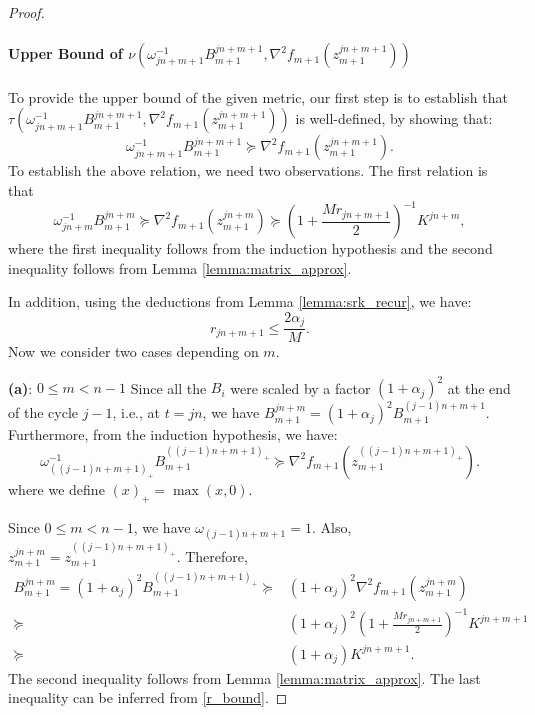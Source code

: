 \documentclass[letterpaper]{article} %
\theoremstyle{plain}
\theoremstyle{definition}
\theoremstyle{remark}
\begin{document}
\begin{proof}
    \paragraph{Upper Bound of $\nu(\omega_{j n + m + 1}^{-1} B_{m + 1}^{j n + m + 1}, \nabla^2 f_{m + 1} (z_{m+1}^{j n + m + 1}))$}
    To provide the upper bound of the given metric, our first step is  to establish that $\tau(\omega_{j n + m + 1}^{-1} B_{m + 1}^{j n + m + 1}, \nabla^2 f_{m + 1} (z_{m+1}^{j n + m + 1}))$ is well-defined, by showing that:
    \begin{equation}
        \omega_{j n + m + 1}^{-1} B_{m + 1}^{j n + m + 1} \succeq \nabla^2 f_{m + 1} (z_{m+1}^{j n + m + 1}).
        \label{eq:valid_metric}
    \end{equation}
    To establish the above relation, we need two observations. The first relation is that 
    \begin{equation*}
        \omega_{j n + m}^{-1} B_{m + 1}^{j n + m} \succeq \nabla^2 f_{m+1}(z_{m+1}^{j n + m}) \succeq \left(1 + \frac{M r_{j n + m + 1}}{2}\right)^{-1} K^{j n + m}, 
    \end{equation*}
    where the first inequality follows from the induction hypothesis and the second inequality follows from Lemma \ref{lemma:matrix_approx}.

    In addition, using the deductions from Lemma \ref{lemma:srk_recur}, we have:
    \begin{equation}
        r_{j n + m + 1} \leq \frac{2 \alpha_j}{M}.
        \label{r_bound}
    \end{equation}
    Now we consider two cases depending on $m$.

    \textbf{(a)}: $0 \leq m < n - 1$
    Since all the $B_i$ were scaled by a factor $(1 + \alpha_j)^2$ at the end of the cycle $j - 1$, i.e., at $t = j n$, we have $B_{m+1}^{j n + m} = (1 + \alpha_j)^2 B_{m+1}^{(j - 1) n + m + 1}$. Furthermore, from the induction hypothesis, we have:
    \begin{equation*}
        \omega_{((j - 1)n + m + 1)_{+}}^{-1} B_{m+1}^{((j - 1) n + m + 1)_{+}} \succeq \nabla^2 f_{m+1}(z_{m+1}^{((j - 1)n + m + 1)_{+}}).
    \end{equation*}
    where we define $(x)_{+} = \max(x, 0)$.

    Since $0 \leq m < n - 1$, we have $\omega_{(j - 1)n + m + 1} = 1$. Also, $z_{m+1}^{j n + m} = z_{m+1}^{((j - 1)n + m + 1)_{+}}$. Therefore,
    \begin{align*}
        B_{m+1}^{j n + m} = (1 + \alpha_j)^2 B_{m+1}^{((j - 1)n + m + 1)_{+}} \succeq & (1 + \alpha_j)^2 \nabla^2 f_{m+1}(z_{m+1}^{j n + m}) \\
        \succeq & (1 + \alpha_j)^2 \left(1 + \frac{M r_{j n + m + 1}}{2}\right)^{-1} K^{j n + m + 1} \\
        \succeq & (1 + \alpha_j) K^{j n + m + 1}.
    \end{align*}
    The second inequality follows from Lemma \ref{lemma:matrix_approx}. The last inequality can be inferred from \eqref{r_bound}.


\end{proof}
\end{document}
